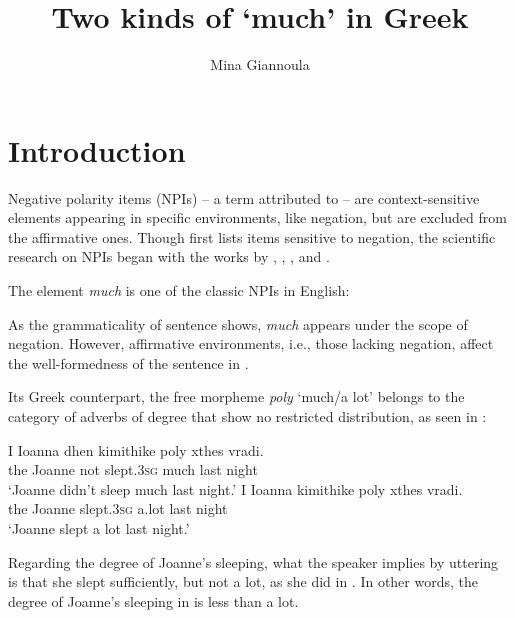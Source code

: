 \documentclass[output=paper]{langscibook}
\author{Mina Giannoula\affiliation{University of Chicago}}
\title{Two kinds of `much' in Greek}
\begin{document}
\maketitle

\section{Introduction} 

Negative polarity items (NPIs) -- a term attributed to \citet{baker1970} -- are context-sensitive elements appearing in specific environments, like negation, but are excluded from the affirmative ones. Though \citet{buyssens1959} first lists items sensitive to negation, the scientific research on NPIs began with the works by \citet{klima1964}, \citet{horn1972prop}, \citet{fauconnier1975a, fauconnier1975b}, and \citet{ladusaw1979}.

The element \textit{much} is one of the classic NPIs in English:

\ea\label{gia:ex1}
        \label{gia:ex1a}
        \label{gia:ex1b}
\z\z

\noindent As the grammaticality of sentence  shows, \textit{much} appears under the scope of negation. However, affirmative environments, i.e., those lacking negation, affect the well-formedness of the sentence in .

Its Greek counterpart, the free morpheme \textit{poly} ‘much/a lot’ belongs to the category of adverbs of degree that show no restricted distribution, as seen in :

\begin{exe}
\ex\label{gia:ex2} \begin{xlist}
        \ex\label{gia:ex2a} \gll I Ioanna dhen kimithike poly xthes vradi. \\
        the Joanne not slept.\textsc{3sg} much last night \\
        \trans `Joanne didn't sleep much last night.'
        \ex\label{gia:ex2b} \gll I Ioanna kimithike poly xthes vradi. \\
        the Joanne slept.\textsc{3sg} a.lot last night \\
        \trans `Joanne slept a lot last night.'
    \end{xlist}
\end{exe}

\noindent Regarding the degree of Joanne’s sleeping, what the speaker implies by uttering  is that she slept  sufficiently, but not a lot, as she did in . In other words, the degree of Joanne’s sleeping in  is less than a lot.
\end{document}
